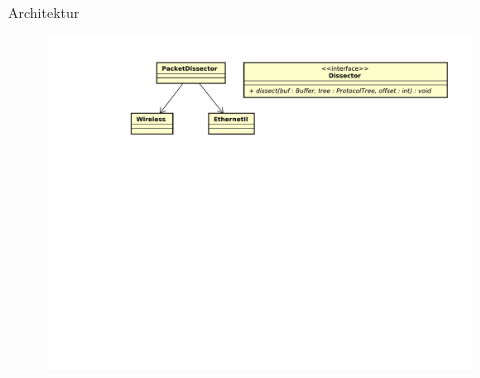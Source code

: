 \begin{frame}{Architektur}
    \begin{figure}
    	\centering
    	\includegraphics[width=\textwidth]{./images/dissector/3.pdf}
    \end{figure}
\end{frame}
